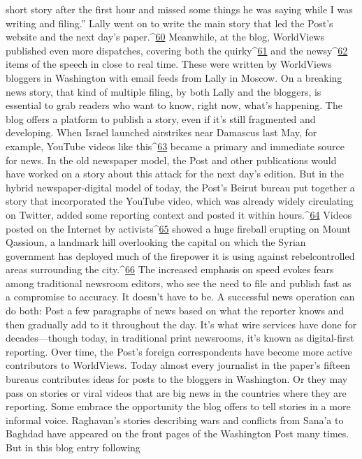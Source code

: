 short story after the first hour and missed some things he was saying while I was writing
and filing.''
Lally went on to write the main story that led the Post’s website and the next day’s
paper.^{\href{#endnotes}{60}} Meanwhile, at the blog, WorldViews published even more dispatches, covering
both the quirky^{\href{#endnotes}{61}} and the newsy^{\href{#endnotes}{62}} items of the speech in close to real time. These were
written by WorldViews bloggers in Washington with email feeds from Lally in Moscow.
On a breaking news story, that kind of multiple filing, by both Lally and the bloggers, is
essential to grab readers who want to know, right now, what’s happening. The blog offers
a platform to publish a story, even if it’s still fragmented and developing.
When Israel launched airstrikes near Damascus last May, for example, YouTube videos
like this^{\href{#endnotes}{63}} became a primary and immediate source for news. In the old newspaper model,
the Post and other publications would have worked on a story about this attack for the
next day’s edition. But in the hybrid newspaper-digital model of today, the Post’s Beirut
bureau put together a story that incorporated the YouTube video, which was already
widely circulating on Twitter, added some reporting context and posted it within hours.^{\href{#endnotes}{64}}
Videos posted on the Internet by activists^{\href{#endnotes}{65}} showed a huge fireball erupting on
Mount Qassioun, a landmark hill overlooking the capital on which the Syrian
government has deployed much of the firepower it is using against rebelcontrolled
areas surrounding the city.^{\href{#endnotes}{66}}
The increased emphasis on speed evokes fears among traditional newsroom editors, who
see the need to file and publish fast as a compromise to accuracy. It doesn’t have to be. A
successful news operation can do both: Post a few paragraphs of news based on what the
reporter knows and then gradually add to it throughout the day. It’s what wire services
have done for decades—though today, in traditional print newsrooms, it’s known as
digital-first reporting.
Over time, the Post’s foreign correspondents have become more active contributors to
WorldViews. Today almost every journalist in the paper’s fifteen bureaus contributes
ideas for posts to the bloggers in Washington. Or they may pass on stories or viral videos
that are big news in the countries where they are reporting. Some embrace the
opportunity the blog offers to tell stories in a more informal voice.
Raghavan’s stories describing wars and conflicts from Sana’a to Baghdad have appeared
on the front pages of the Washington Post many times. But in this blog entry following
